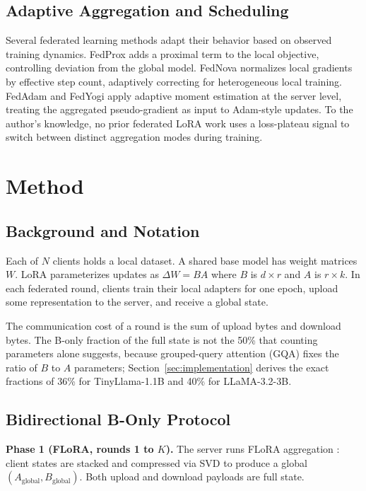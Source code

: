 \documentclass[iicol,pdflatex,sn-mathphys-num]{sn-jnl}
\begin{document}
\subsection{Adaptive Aggregation and Scheduling}
Several federated learning methods adapt their behavior based on observed training dynamics. FedProx \cite{li2020fedprox} adds a proximal term to the local objective, controlling deviation from the global model. FedNova \cite{wang2020fednova} normalizes local gradients by effective step count, adaptively correcting for heterogeneous local training. FedAdam and FedYogi \cite{reddi2020adaptive} apply adaptive moment estimation at the server level, treating the aggregated pseudo-gradient as input to Adam-style updates. To the author's knowledge, no prior federated LoRA work uses a loss-plateau signal to switch between distinct aggregation modes during training.

\section{Method}
\label{sec:method}

\subsection{Background and Notation}
Each of $N$ clients holds a local dataset. A shared base model has weight matrices $W$. LoRA \cite{hu2022lora} parameterizes updates as $\Delta W = BA$ where $B$ is $d \times r$ and $A$ is $r \times k$. In each federated round, clients train their local adapters for one epoch, upload some representation to the server, and receive a global state.

The communication cost of a round is the sum of upload bytes and download bytes. The B-only fraction of the full state is not the 50\% that counting parameters alone suggests, because grouped-query attention (GQA) fixes the ratio of $B$ to $A$ parameters; Section~\ref{sec:implementation} derives the exact fractions of 36\% for TinyLlama-1.1B and 40\% for LLaMA-3.2-3B.

\subsection{Bidirectional B-Only Protocol}
\textbf{Phase 1 (FLoRA, rounds 1 to $K$).}
The server runs FLoRA aggregation \cite{wang2024flora}: client states are stacked and compressed via SVD to produce a global $(A_{\text{global}}, B_{\text{global}})$. Both upload and download payloads are full state.
\end{document}
